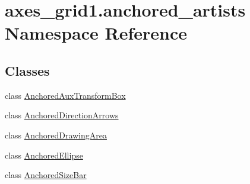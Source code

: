 \hypertarget{namespaceaxes__grid1_1_1anchored__artists}{}\section{axes\+\_\+grid1.\+anchored\+\_\+artists Namespace Reference}
\label{namespaceaxes__grid1_1_1anchored__artists}
\subsection*{Classes}
\begin{DoxyCompactItemize}
\item 
class \hyperlink{classaxes__grid1_1_1anchored__artists_1_1AnchoredAuxTransformBox}{Anchored\+Aux\+Transform\+Box}
\item 
class \hyperlink{classaxes__grid1_1_1anchored__artists_1_1AnchoredDirectionArrows}{Anchored\+Direction\+Arrows}
\item 
class \hyperlink{classaxes__grid1_1_1anchored__artists_1_1AnchoredDrawingArea}{Anchored\+Drawing\+Area}
\item 
class \hyperlink{classaxes__grid1_1_1anchored__artists_1_1AnchoredEllipse}{Anchored\+Ellipse}
\item 
class \hyperlink{classaxes__grid1_1_1anchored__artists_1_1AnchoredSizeBar}{Anchored\+Size\+Bar}
\end{DoxyCompactItemize}
